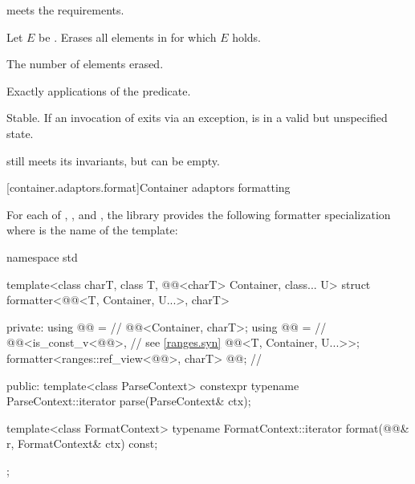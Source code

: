 \begin{itemdescr}
\pnum
\expects
{} meets the  requirements.

\pnum
\effects
Let $E$ be .
Erases all elements  in  for which $E$ holds.

\pnum
\returns
The number of elements erased.

\pnum
\complexity
Exactly  applications of the predicate.

\pnum
\remarks
Stable.
If an invocation of  exits via an exception,
 is in a valid but unspecified state.
\begin{note}
 still meets its invariants, but can be empty.
\end{note}
\end{itemdescr}

[container.adaptors.format]{Container adaptors formatting}

\pnum
For each of
,
, and
,
the library provides the following formatter specialization
where  is the name of the template:

%
\begin{codeblock}
namespace std {
  template<class charT, class T, @@<charT> Container, class... U>
  struct formatter<@@<T, Container, U...>, charT> {
  private:
    using @@ =                                             // \expos
      @@<Container, charT>;
    using @@ =                                               // \expos
      @@<is_const_v<@@>,                          // see \ref{ranges.syn}
                  @@<T, Container, U...>>;
    formatter<ranges::ref_view<@@>, charT> @@;    // \expos

  public:
    template<class ParseContext>
      constexpr typename ParseContext::iterator
        parse(ParseContext& ctx);

    template<class FormatContext>
      typename FormatContext::iterator
        format(@@& r, FormatContext& ctx) const;
  };
}
\end{codeblock}

